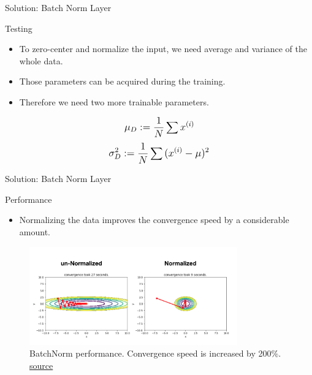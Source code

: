 \begin{frame}{Solution: Batch Norm Layer}
	\begin{block}{Testing}
		\begin{itemize}
			\item To zero-center and normalize the input, we need average and variance of the whole data.
			\item Those parameters can be acquired during the training.
			\item Therefore we need two more trainable parameters.
		\end{itemize}
		\vspace{0.1\textheight}
			\begin{equation*}
				\mathlarger{
					\mu_D := \frac{1}{N} \sum{x^{(i)}}
				}
			\end{equation*}
			\begin{equation*}
				\mathlarger{
					\sigma_D^2 := \frac{1}{N} \sum{(x^{(i)} - \mu)^2}
				}
			\end{equation*}
	\end{block}
\end{frame}
\begin{frame}{Solution: Batch Norm Layer}
	\begin{block}{Performance}
		\begin{itemize}
			\item Normalizing the data improves the convergence speed by a considerable amount.
		\end{itemize}
		\begin{figure}[H]
			\centering
			\includegraphics[width=0.8\textwidth]{Figs/section_4/batchnorm_3.png}
			\caption{BatchNorm performance. Convergence speed is increased by 200\%.  \href{https://jsideas.net/batch_normalization/}{source}}
		\end{figure}
	\end{block}
\end{frame}
